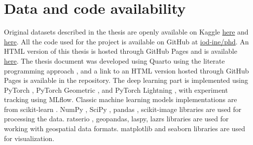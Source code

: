 \section{Data and code availability}

Original datasets described in the thesis are openly available on Kaggle \href{https://www.kaggle.com/datasets/sentinel3734/tree-detection-lidar-rgb}{here} and \href{https://www.kaggle.com/datasets/sentinel3734/uav-point-clouds-of-individual-trees}{here}.
All the code used for the project is available on GitHub at \href{https://github.com/iod-ine/phd}{iod-ine/phd}.
An HTML version of this thesis is hosted through GitHub Pages and is available \href{https://iod-ine.github.io/thesis}{here}.
The thesis document was developed using Quarto \cite{Allaire_Quarto_2024} using the literate programming approach \cite{knuth84}, and a link to an HTML version hosted through GitHub Pages is available in the repository.
The deep learning part is implemented using PyTorch \cite{Ansel_PyTorch_2_Faster_2024}, PyTorch Geometric \cite{Fey_Fast_Graph_Representation_2019}, and PyTorch Lightning \cite{Falcon_PyTorch_Lightning_2019}, with experiment tracking using MLflow.
Classic machine learning models implementations are from scikit-learn \cite{scikit-learn}.
NumPy \cite{2020NumPy-Array}, SciPy \cite{2020SciPy-NMeth}, pandas \cite{The_pandas_development_team_pandas-dev_pandas_Pandas}, scikit-image \cite{van_der_Walt_scikit-image_image_processing_2014} libraries are used for processing the data.
ratserio \cite{gillies_2019}, geopandas, laspy, lazrs libraries are used for working with geospatial data formats.
matplotlib \cite{Hunter_Matplotlib_A_2D_2007} and seaborn \cite{waskomSeabornStatisticalData2021} libraries are used for visualization.
